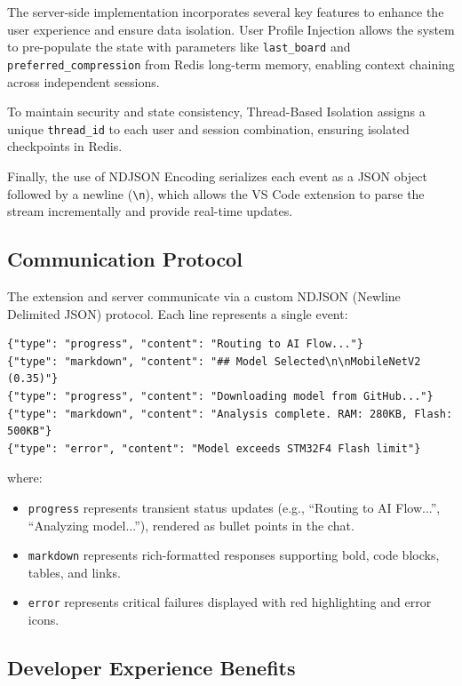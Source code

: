 The server-side implementation incorporates several key features to enhance the user experience and ensure data isolation.
User Profile Injection allows the system to pre-populate the state with parameters like \texttt{last\_board} and \texttt{preferred\_compression} from Redis long-term memory, enabling context chaining across independent sessions.

To maintain security and state consistency, Thread-Based Isolation assigns a unique \texttt{thread\_id} to each user and session combination, ensuring isolated checkpoints in Redis.

Finally, the use of NDJSON Encoding serializes each event as a JSON object followed by a newline (\texttt{\textbackslash n}), which allows the VS Code extension to parse the stream incrementally and provide real-time updates.


\subsection{Communication Protocol}

The extension and server communicate via a custom NDJSON (Newline Delimited JSON) protocol. Each line represents a single event:

\begin{verbatim}
{"type": "progress", "content": "Routing to AI Flow..."}
{"type": "markdown", "content": "## Model Selected\n\nMobileNetV2 (0.35)"}
{"type": "progress", "content": "Downloading model from GitHub..."}
{"type": "markdown", "content": "Analysis complete. RAM: 280KB, Flash: 500KB"}
{"type": "error", "content": "Model exceeds STM32F4 Flash limit"}
\end{verbatim}

where:
\begin{itemize}
  \item \texttt{progress} represents transient status updates (e.g., ``Routing to AI Flow...'', ``Analyzing model...''), rendered as bullet points in the chat.
  \item \texttt{markdown} represents rich-formatted responses supporting bold, code blocks, tables, and links.
  \item \texttt{error} represents critical failures displayed with red highlighting and error icons.
\end{itemize}

\subsection{Developer Experience Benefits}

